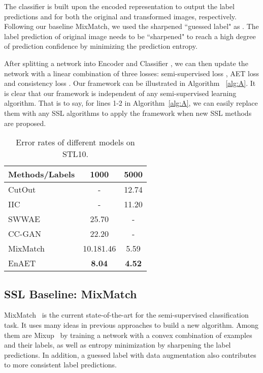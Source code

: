 \documentclass[journal]{IEEEtran}
\begin{document}
\par The classifier  is built upon the encoded representation to output the label predictions  and  for both the original and transformed images, respectively. Following our baseline MixMatch, we used the sharpened ``guessed label" as . The label prediction of original image needs to be ``sharpened" \cite{goodfellow2016deep} to reach a high degree of prediction confidence by minimizing the prediction entropy.
\par After splitting a network into Encoder  and Classifier , we can then update the network with a linear combination of three losses: semi-supervised loss , AET loss  and consistency loss . Our framework can be illustrated in Algorithm ~\ref{alg:A}. It is  clear that our framework is independent of any semi-supervised learning algorithm. That is to say, for lines 1-2 in Algorithm~\ref{alg:A}, we can easily replace them with any SSL algorithms to apply the framework when new SSL methods are proposed.
\begin{table}[]
\centering
\caption{Error rates of different models on STL10.}
\label{tab:stl10}
\begin{tabular}{lcc}
\toprule
Methods/Labels & 1000 & 5000 \\\midrule
CutOut \cite{devries2017improved} & - & 12.74 \\
IIC \cite{ji2018invariant} & - & 11.20 \\
SWWAE \cite{zhao2015stacked} & 25.70 & - \\
CC-GAN \cite{denton2016semi} & 22.20 & - \\
MixMatch \cite{berthelot2019mixmatch} & 10.181.46 & 5.59 \\\midrule
EnAET & \textbf{8.04} & \textbf{4.52}\\
\bottomrule
\end{tabular}
\end{table}

\subsection{SSL Baseline: MixMatch}
\par MixMatch~\cite{berthelot2019mixmatch} is the current state-of-the-art for the semi-supervised classification task. It uses many ideas in previous approaches to build a new algorithm. Among them are  Mixup~\cite{zhang2017mixup} by training a network with a convex combination of examples and their labels, as well as entropy minimization by sharpening the label predictions. In addition, a guessed label with data augmentation also contributes to more consistent label predictions.
\end{document}
